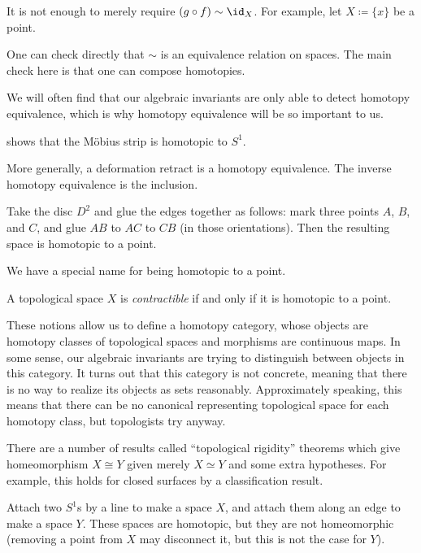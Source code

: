 \documentclass[../notes.tex]{subfiles}
\begin{document}
\begin{remark}
	It is not enough to merely require $(g\circ f)\sim\id_X$. For example, let $X\coloneqq\{x\}$ be a point.
\end{remark}
\begin{remark}
	One can check directly that $\sim$ is an equivalence relation on spaces. The main check here is that one can compose homotopies.
\end{remark}
We will often find that our algebraic invariants are only able to detect homotopy equivalence, which is why homotopy equivalence will be so important to us.
\begin{example}
	 shows that the M\"obius strip is homotopic to $S^1$.
\end{example}
\begin{example}
	More generally, a deformation retract is a homotopy equivalence. The inverse homotopy equivalence is the inclusion.\todo{}
\end{example}
\begin{example}
	Take the disc $D^2$ and glue the edges together as follows: mark three points $A$, $B$, and $C$, and glue $AB$ to $AC$ to $CB$ (in those orientations). Then the resulting space is homotopic to a point.
\end{example}
We have a special name for being homotopic to a point.
\begin{definition}[contractible]
	A topological space $X$ is \textit{contractible} if and only if it is homotopic to a point.
\end{definition}
These notions allow us to define a homotopy category, whose objects are homotopy classes of topological spaces and morphisms are continuous maps. In some sense, our algebraic invariants are trying to distinguish between objects in this category. It turns out that this category is not concrete, meaning that there is no way to realize its objects as sets reasonably. Approximately speaking, this means that there can be no canonical representing topological space for each homotopy class, but topologists try anyway.
\begin{remark}
	There are a number of results called ``topological rigidity'' theorems which give homeomorphism $X\cong Y$ given merely $X\simeq Y$ and some extra hypotheses. For example, this holds for closed surfaces by a classification result.
\end{remark}
\begin{example}
	Attach two $S^1$s by a line to make a space $X$, and attach them along an edge to make a space $Y$. These spaces are homotopic, but they are not homeomorphic (removing a point from $X$ may disconnect it, but this is not the case for $Y$).
\end{example}
\end{document}
